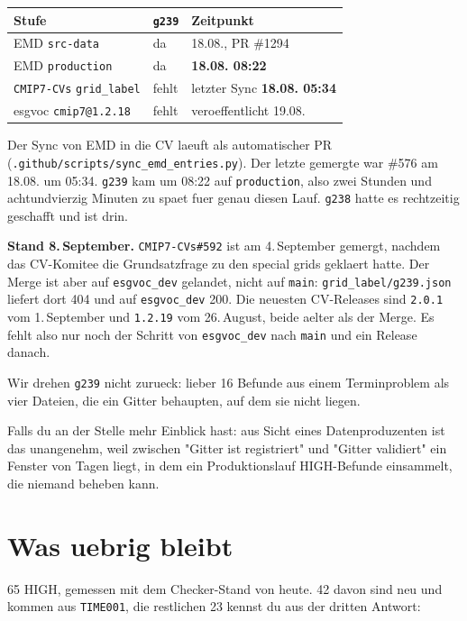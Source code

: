 \documentclass[11pt,a4paper]{article}
\newcommand{\code}[1]{\texttt{\small #1}}
\begin{document}
\begin{center}
\begin{tabular}{lll}
\toprule
\textbf{Stufe} & \textbf{\code{g239}} & \textbf{Zeitpunkt} \\
\midrule
EMD \code{src-data}                & da      & 18.08., PR \#1294 \\
EMD \code{production}              & da      & \textbf{18.08. 08:22} \\
\code{CMIP7-CVs} \code{grid\_label} & fehlt   & letzter Sync \textbf{18.08. 05:34} \\
esgvoc \code{cmip7@1.2.18}          & fehlt   & veroeffentlicht 19.08. \\
\bottomrule
\end{tabular}
\end{center}

Der Sync von EMD in die CV laeuft als automatischer PR
(\code{.github/scripts/sync\_emd\_entries.py}). Der letzte gemergte war \#576 am
18.08. um 05:34. \code{g239} kam um 08:22 auf \code{production}, also zwei Stunden
und achtundvierzig Minuten zu spaet fuer genau diesen Lauf. \code{g238} hatte es
rechtzeitig geschafft und ist drin.

\textbf{Stand 8.\,September.} \code{CMIP7-CVs\#592} ist am 4.\,September gemergt,
nachdem das CV-Komitee die Grundsatzfrage zu den \glqq special grids\grqq{} geklaert
hatte. Der Merge ist aber auf \code{esgvoc\_dev} gelandet, nicht auf \code{main}:
\code{grid\_label/g239.json} liefert dort 404 und auf \code{esgvoc\_dev} 200. Die
neuesten CV-Releases sind \code{2.0.1} vom 1.\,September und \code{1.2.19} vom
26.\,August, beide aelter als der Merge. Es fehlt also nur noch der Schritt von
\code{esgvoc\_dev} nach \code{main} und ein Release danach.

Wir drehen \code{g239} nicht zurueck: lieber 16 Befunde aus einem Terminproblem als
vier Dateien, die ein Gitter behaupten, auf dem sie nicht liegen.

Falls du an der Stelle mehr Einblick hast: aus Sicht eines Datenproduzenten
ist das unangenehm, weil zwischen "Gitter ist registriert" und "Gitter validiert"
ein Fenster von Tagen liegt, in dem ein Produktionslauf HIGH-Befunde einsammelt,
die niemand beheben kann.

\section{Was uebrig bleibt}

65 HIGH, gemessen mit dem Checker-Stand von heute. 42 davon sind neu und kommen
aus \code{TIME001}, die restlichen 23 kennst du aus der dritten Antwort:
\end{document}
